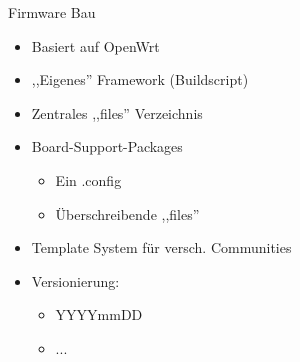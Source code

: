 \begin{frame}{Firmware Bau}
    \begin{itemize}
        \item Basiert auf OpenWrt
        \item ,,Eigenes'' Framework (Buildscript)
        \item Zentrales ,,files'' Verzeichnis
        \item Board-Support-Packages
        \begin{itemize}
            \item Ein .config
            \item Überschreibende ,,files''
        \end{itemize}
        \item Template System für versch. Communities
        \item Versionierung:
            \begin{itemize}
                \item YYYYmmDD
                \item ...
            \end{itemize}
    \end{itemize}
\end{frame}
